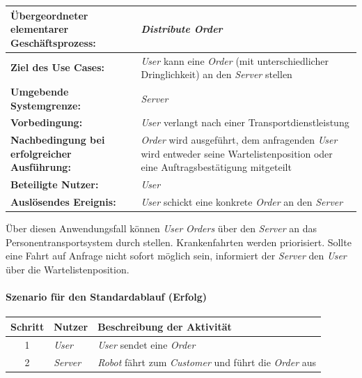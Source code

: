 			\begin{table}[H]
				\centering
				\begin{tabularx}{\textwidth}{|p{5cm}|X|}
					\hline
					\textbf{Übergeordneter elementarer Geschäftsprozess:} & \emph{Distribute Order}  \\ \hline
					\textbf{Ziel des Use Cases:} & \emph{User} kann eine \emph{Order} (mit unterschiedlicher Dringlichkeit) an den \emph{Server} stellen \\ \hline
					\textbf{Umgebende Systemgrenze:} & \emph{Server} \\ \hline
					\textbf{Vorbedingung:} & \emph{User} verlangt nach einer Transportdienstleistung \\ \hline
					\textbf{Nachbedingung bei erfolgreicher Ausführung:} & \emph{Order} wird ausgeführt, dem anfragenden \emph{User} wird entweder seine Wartelistenposition oder eine Auftragsbestätigung mitgeteilt \\ \hline
					\textbf{Beteiligte Nutzer:} & \emph{User} \\ \hline
					\textbf{Auslösendes Ereignis:} & \emph{User} schickt eine konkrete \emph{Order} an den \emph{Server} \\
					\hline
				\end{tabularx}
			\end{table}

			Über diesen Anwendungsfall können \emph{User} \emph{Orders} über den \emph{Server} an das Personentransportsystem durch stellen.
			Krankenfahrten werden priorisiert. Sollte eine Fahrt auf Anfrage nicht sofort möglich sein, informiert der \emph{Server} den \emph{User} über die Wartelistenposition.

				\paragraph*{Szenario für den Standardablauf (Erfolg)}

				\begin{table}[H]
					\centering
					\begin{tabularx}{\textwidth}{|c|p{2cm}|X|}
					\hline
					Schritt & Nutzer & Beschreibung der Aktivität \\ \hline
					1 & \emph{User} & \emph{User} sendet eine \emph{Order} \\
					2 & \emph{Server} & \emph{Robot} fährt zum \emph{Customer} und führt die \emph{Order} aus  \\
					\hline
					\end{tabularx}
				\end{table}
